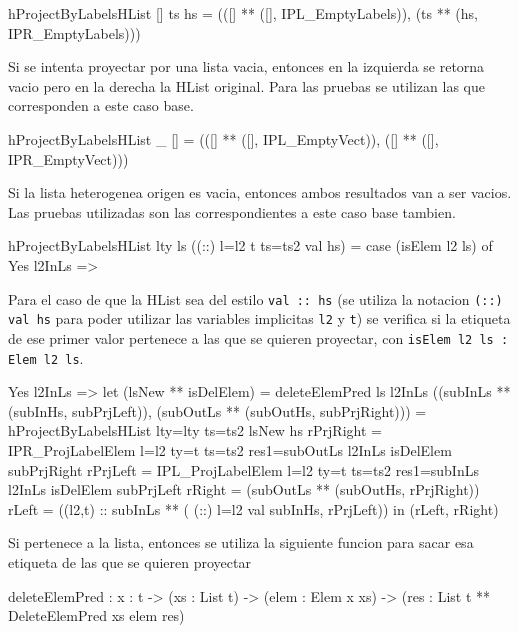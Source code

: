 \begin{code}
hProjectByLabelsHList [] {ts} hs = 
  (([] ** ([], IPL_EmptyLabels)),
  (ts ** (hs, IPR_EmptyLabels)))
\end{code}

Si se intenta proyectar por una lista vacia, entonces en la izquierda se retorna vacio pero en la derecha la HList original. Para las pruebas se utilizan las que corresponden a este caso base.

\begin{code}
hProjectByLabelsHList _ [] =
  (([] ** ([], IPL_EmptyVect)),
  ([] ** ([], IPR_EmptyVect)))
\end{code}

Si la lista heterogenea origen es vacia, entonces ambos resultados van a ser vacios. Las pruebas utilizadas son las correspondientes a este caso base tambien.

\begin{code}
hProjectByLabelsHList {lty} ls ((::) {l=l2} {t} 
    {ts=ts2} val hs) =
  case (isElem l2 ls) of
    Yes l2InLs =>
\end{code}

Para el caso de que la HList sea del estilo \texttt{val :: hs} (se utiliza la notacion \texttt{(::) val hs} para poder utilizar las variables implicitas \texttt{l2} y \texttt{t}) se verifica si la etiqueta de ese primer valor pertenece a las que se quieren proyectar, con \texttt{isElem l2 ls : Elem l2 ls}.

\begin{code}
Yes l2InLs =>
  let
    (lsNew ** isDelElem) = deleteElemPred ls l2InLs
    ((subInLs ** (subInHs, subPrjLeft)), 
      (subOutLs ** (subOutHs, subPrjRight))) =
      hProjectByLabelsHList {lty=lty} {ts=ts2} lsNew hs
    rPrjRight = IPR_ProjLabelElem {l=l2} {ty=t} {ts=ts2} 
      {res1=subOutLs} l2InLs isDelElem subPrjRight
    rPrjLeft = IPL_ProjLabelElem {l=l2} {ty=t} {ts=ts2} 
      {res1=subInLs} l2InLs isDelElem subPrjLeft
    rRight = (subOutLs ** (subOutHs, rPrjRight))
    rLeft = ((l2,t) :: subInLs ** (
      (::) {l=l2} val subInHs, rPrjLeft))
   in
     (rLeft, rRight)
\end{code}

Si pertenece a la lista, entonces se utiliza la siguiente funcion para sacar esa etiqueta de las que se quieren proyectar

\begin{code}
deleteElemPred : {x : t} -> (xs : List t) -> 
  (elem : Elem x xs) -> 
  (res : List t ** DeleteElemPred xs elem res)
\end{code}

